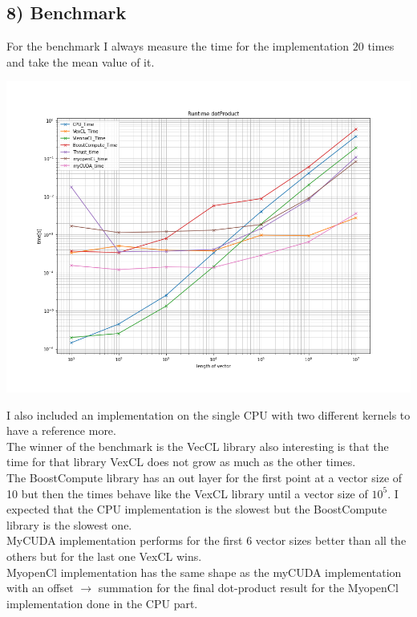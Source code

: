 \documentclass[11pt,a4paper]{article}
\begin{document}
\subsection*{8) Benchmark}
For the benchmark I always measure the time for the implementation $20$ times and take the mean value of it.
\begin{center}
	\begin{minipage}[t]{0.8\textwidth}
		\includegraphics[width=\textwidth]{Bilder/Runtime_dotProduct}
	\end{minipage}
\end{center}
\noindent
I also included an implementation on the single CPU with two different kernels to have a reference more.\\
The winner of the benchmark is the VecCL library also interesting is that the time for that library VexCL does not grow as much as the other times.\\
The BoostCompute library has an out layer for the first point at a vector size of 10 but then the times behave like the VexCL library until a vector size of $10^5$. I expected that the CPU implementation is the slowest but the BoostCompute library is the slowest one.\\
MyCUDA implementation performs for the first 6 vector sizes better than all the others but for the last one VexCL wins.\\
MyopenCl implementation has the same shape as the myCUDA implementation with an offset $\rightarrow$ summation for the final dot-product result for the MyopenCl implementation done in the CPU part. 
\end{document}
